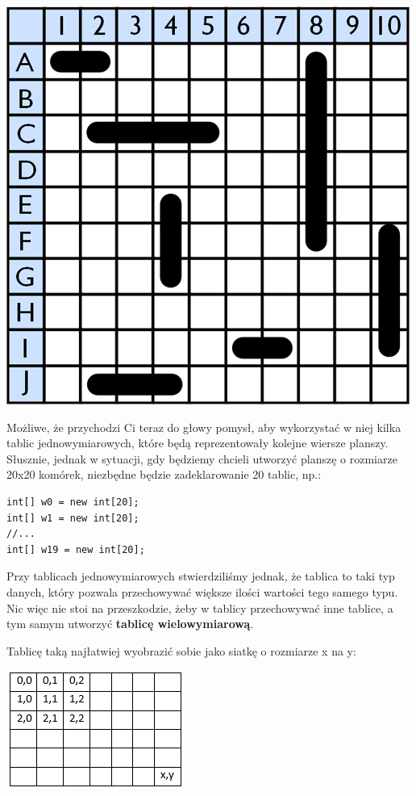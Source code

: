 \documentclass[letterpaper,10pt,english]{sphinxmanual}
\begin{document}
{\hfill\includegraphics{ships.png}\hfill}

Możliwe, że przychodzi Ci teraz do głowy pomysł, aby wykorzystać w niej kilka tablic jednowymiarowych, które będą reprezentowały kolejne wiersze planszy. Słusznie, jednak w sytuacji, gdy będziemy chcieli utworzyć planszę o rozmiarze 20x20 komórek, niezbędne będzie zadeklarowanie 20 tablic, np.:

\begin{Verbatim}[commandchars=\\\{\}]
int[] w0 = new int[20];
int[] w1 = new int[20];
//...
int[] w19 = new int[20];
\end{Verbatim}

Przy tablicach jednowymiarowych stwierdziliśmy jednak, że tablica to taki typ danych, który pozwala przechowywać większe ilości wartości tego samego typu. Nic więc nie stoi na przeszkodzie, żeby w tablicy przechowywać inne tablice, a tym samym utworzyć \textbf{tablicę wielowymiarową}.

Tablicę taką najłatwiej wyobrazić sobie jako siatkę o rozmiarze x na y:

{\hfill\includegraphics{multiarray.png}\hfill}
\end{document}

